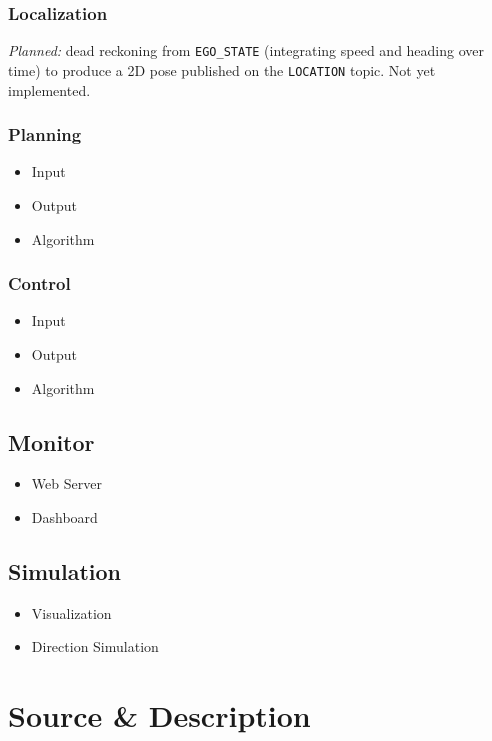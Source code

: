 \documentclass[12pt,a4paper]{article}
\begin{document}
\subsubsection{Localization}

\textit{Planned:} dead reckoning from \texttt{EGO\_STATE} (integrating speed and
heading over time) to produce a 2D pose published on the \texttt{LOCATION} topic.
Not yet implemented.

\subsubsection{Planning}
\begin{itemize}
    \item Input
    \item Output
    \item Algorithm
\end{itemize}

\subsubsection{Control}
\begin{itemize}
    \item Input
    \item Output
    \item Algorithm
\end{itemize}

\subsection{Monitor}

\begin{itemize}
    \item Web Server
    \item Dashboard
\end{itemize}

\subsection{Simulation}

\begin{itemize}
    \item Visualization
    \item Direction Simulation
\end{itemize}

\section{Source \& Description}
\end{document}

